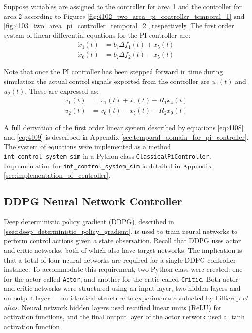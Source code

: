 Suppose variables are assigned to the controller for area 1 and the controller for area 2 according to Figures \ref{fig:4102_two_area_pi_controller_temporal_1} and \ref{fig:4103_two_area_pi_controller_temporal_2}, respectively. The first order system of linear differential equations for the PI controller are:
\begin{align}
	\dot{x}_1(t) &= b_1 \Delta f_1(t) + x_5(t) \label{eq:4108} \\
	\dot{x}_6(t) &= b_2 \Delta f_2(t) - x_5(t) \label{eq:4109}
\end{align}

Note that once the PI controller has been stepped forward in time during simulation the actual control signals exported from the controller are $u_1(t)$ and $u_2(t)$. These are expressed as:
\begin{align}
	u_1(t) &= x_1(t) + x_5(t) - R_1 x_4(t) \\
	u_2(t) &= x_6(t) - x_5(t) - R_2 x_9(t) 
\end{align}

A full derivation of the first order linear system described by equations \ref{eq:4108} and \ref{eq:4109} is described in Appendix \ref{sec:temporal_domain_for_pi_controller}. The system of equations were implemented as a method \verb|int_control_system_sim| in a Python class \verb|ClassicalPiController|. Implementation for \verb|int_control_system_sim| is detailed in Appendix \ref{sec:implementation_of_controller}.


\subsection{DDPG Neural Network Controller}
Deep deterministic policy gradient (DDPG), described in \textsection \ref{ssec:deep_deterministic_policy_gradient}, is used to train neural networks to perform control actions given a state observation. Recall that DDPG uses actor and critic networks, both of which also have target networks. The implication is that a total of four neural networks are required for a single DDPG controller instance. To accommodate this requirement, two Python class were created: one for the actor called \verb|Actor|, and another for the critic called \verb|Critic|. Both actor and critic networks were structured using an input layer, two hidden layers and an output layer --- an identical structure to experiments conducted by Lillicrap \textit{et alias}. Neural network hidden layers used rectified linear units (ReLU) for activation functions, and the final output layer of the actor network used a $\tanh$ activation function.







